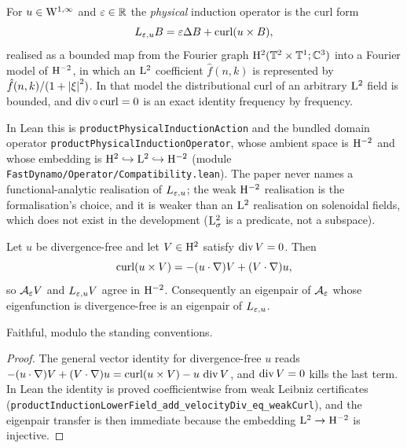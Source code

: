 \begin{definition}
  \label{def:finish:physical-operator}
  \leanok
  For $u\in\mathrm{W}^{1,\infty}$ and $\varepsilon\in\mathbb{R}$ the \emph{physical} induction operator is the curl form
  \[
    L_{\varepsilon,u}B=\varepsilon\Delta B+\operatorname{curl}(u\times B),
  \]
  realised as a bounded map from the Fourier graph $\mathrm{H}^2(\mathbb{T}^2\times\mathbb{T}^1;\mathbb{C}^3)$ into a Fourier
  model of $\mathrm{H}^{-2}$, in which an $\mathrm{L}^2$ coefficient $\hat f(n,k)$ is represented by
  $\hat f(n,k)/(1+\left\lvert\xi\right\rvert^2)$.  In that model the distributional curl of an arbitrary $\mathrm{L}^2$
  field is bounded, and $\operatorname{div}\circ\operatorname{curl}=0$ is an exact identity frequency by frequency.
\end{definition}

In Lean this is \texttt{productPhysicalInductionAction} and the bundled domain operator
\texttt{productPhysicalInductionOperator}, whose ambient space is $\mathrm{H}^{-2}$ and whose embedding
is $\mathrm{H}^2\hookrightarrow\mathrm{L}^2\hookrightarrow\mathrm{H}^{-2}$ (module
\texttt{FastDynamo/Operator/Compatibility.lean}).  The paper never names a functional-analytic
realisation of $L_{\varepsilon,u}$; the weak $\mathrm{H}^{-2}$ realisation is the formalisation's choice, and
it is weaker than an $\mathrm{L}^2$ realisation on solenoidal fields, which does not exist in the
development ($\mathrm{L}^2_\sigma$ is a predicate, not a subspace).

\begin{lemma}
  \label{lem:finish:physical-compatibility}
  \leanok
  Let $u$ be divergence-free and let $V\in\mathrm{H}^2$ satisfy $\operatorname{div} V=0$.  Then
  \[
    \operatorname{curl}(u\times V)=-(u\cdot\nabla)V+(V\cdot\nabla)u,
  \]
  so $\mathcal{A}_\varepsilon V$ and $L_{\varepsilon,u}V$ agree in $\mathrm{H}^{-2}$.  Consequently an eigenpair of
  $\mathcal{A}_\varepsilon$ whose eigenfunction is divergence-free is an eigenpair of $L_{\varepsilon,u}$.
\end{lemma}

Faithful, modulo the standing conventions.

\begin{proof}
  \leanok
  The general vector identity for divergence-free $u$ reads
  $-(u\cdot\nabla)V+(V\cdot\nabla)u=\operatorname{curl}(u\times V)-u\,\operatorname{div} V$, and $\operatorname{div} V=0$ kills the last
  term.  In Lean the identity is proved coefficientwise from weak Leibniz certificates
  (\texttt{productInductionLowerField\_add\_velocityDiv\_eq\_weakCurl}), and the eigenpair transfer
  is then immediate because the embedding $\mathrm{L}^2\to\mathrm{H}^{-2}$ is injective.
\end{proof}

